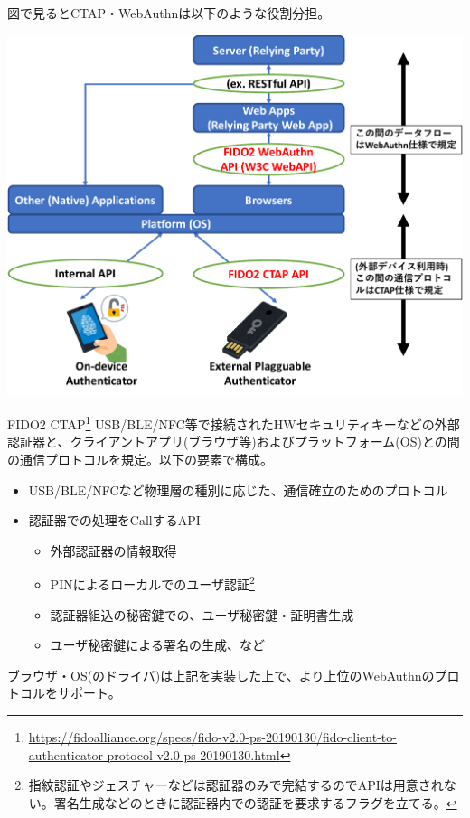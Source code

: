 \documentclass[12pt,dvipdfmx,uplatex]{beamer}
\begin{document}
\begin{frame}
図で見るとCTAP・WebAuthnは以下のような役割分担。
\begin{center}
\includegraphics[width=0.8\linewidth]{Figs/FIDO2-spec-structure.pdf}
\end{center}
\end{frame}

\begin{frame}
\begin{block}{\small FIDO2 CTAP\footnote[frame]{\tiny \url{https://fidoalliance.org/specs/fido-v2.0-ps-20190130/fido-client-to-authenticator-protocol-v2.0-ps-20190130.html}}}
USB/BLE/NFC等で接続されたHWセキュリティキーなどの\alert{外部認証器と、クライアントアプリ(ブラウザ等)およびプラットフォーム(OS)との間の通信プロトコル}を規定。以下の要素で構成。
\begin{itemize}
\item USB/BLE/NFCなど物理層の種別に応じた、通信確立のためのプロトコル
\item 認証器での処理をCallするAPI
\begin{itemize}
\item 外部認証器の情報取得
\item PINによるローカルでのユーザ認証\footnote[frame]{\tiny 指紋認証やジェスチャーなどは認証器のみで完結するのでAPIは用意されない。署名生成などのときに認証器内での認証を要求するフラグを立てる。}
\item 認証器組込の秘密鍵での、ユーザ秘密鍵・証明書生成
\item ユーザ秘密鍵による署名の生成、など
\end{itemize}
\end{itemize}
\end{block}
ブラウザ・OS(のドライバ)は上記を実装した上で、より上位のWebAuthnのプロトコルをサポート。
\end{frame}
\end{document}
